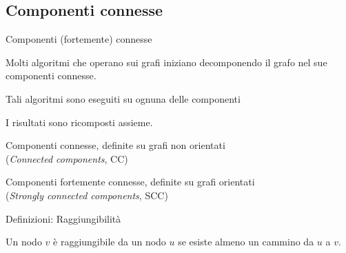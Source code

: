 \subsection{Componenti connesse}

\begin{frame}{Componenti (fortemente) connesse}

\vspace{-9pt}
\begin{myboxtitle}[Motivazioni]
\BIL
\item Molti algoritmi che operano sui grafi iniziano decomponendo 
il grafo nel sue componenti connesse.
\item Tali algoritmi sono eseguiti su ognuna delle componenti
\item I risultati sono ricomposti assieme.
\EIL
\end{myboxtitle}

\begin{myboxtitle}[Definizioni]
\BIL
\item \alert{Componenti connesse}, definite su grafi \alert{non orientati}\\
(\emph{Connected components}, CC)
\item \alert{Componenti fortemente connesse}, definite su \alert{grafi orientati}\\
(\emph{Strongly connected components}, SCC)
\EIL
\end{myboxtitle}

\end{frame}

\begin{frame}{Definizioni: Raggiungibilità}

\vspace{-9pt}
\begin{myboxtitle}[Definizione]
Un nodo $v$ è \alert{raggiungibile} da un nodo $u$ se esiste almeno un cammino da $u$ a $v$.
\end{myboxtitle}

\end{frame}



